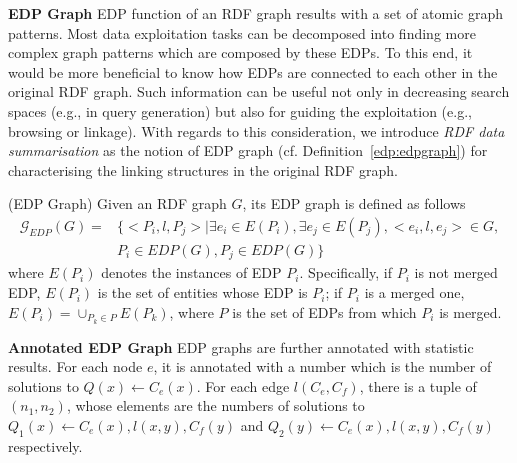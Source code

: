 \noindent \textbf{EDP Graph} EDP function of an RDF graph results with a set of atomic graph patterns. Most data exploitation tasks can be decomposed into finding more complex graph patterns which are composed by these EDPs. To this end, it would be more beneficial to know how EDPs are connected to each other in the original RDF graph. Such information can be useful not only in decreasing search spaces (e.g., in query generation) but also for guiding the exploitation (e.g., browsing or linkage). With regards to this consideration, we introduce \emph{RDF data summarisation} as the notion of EDP graph (cf. Definition~\ref{edp:edpgraph}) for characterising the linking structures in the original RDF graph.
\vspace{-1ex}
\begin{definition} 
\label{edp:edpgraph} (EDP Graph) Given an RDF graph $G$, its EDP graph is defined as follows
\begin{equation}
\begin{split}
\mathcal{G}_{EDP}(G)= & 
\{<P_i,l,P_j>|\exists e_i \in E(P_i ), \exists e_j \in E(P_j ),<e_i,l,e_j> \in G, \\ 
& P_i \in EDP(G),P_j \in EDP(G) \}
\end{split}
\end{equation}
where $E(P_i)$ denotes the instances of EDP $P_i$. Specifically, if $P_i$ is not merged EDP, $E(P_i)$ is the set of entities whose EDP is $P_i$; if $P_i$  is a merged one, $E(P_i )=\cup_{P_k \in P}{E(P_k)}$, where $P$ is the set of EDPs from which $P_i$  is merged.
\end{definition}

\noindent \textbf{Annotated EDP Graph} EDP graphs are further annotated with statistic results. For each node $e$, it is annotated with a number which is the number of solutions to $Q(x) \leftarrow C_e(x)$. For each edge $l(C_e, C_f)$, there is a tuple of $(n_1, n_2)$, whose elements are the numbers of solutions to $Q_1(x) \leftarrow C_e(x), l(x,y), C_f(y)$ and $Q_2(y) \leftarrow C_e(x), l(x,y), C_f(y)$ respectively.